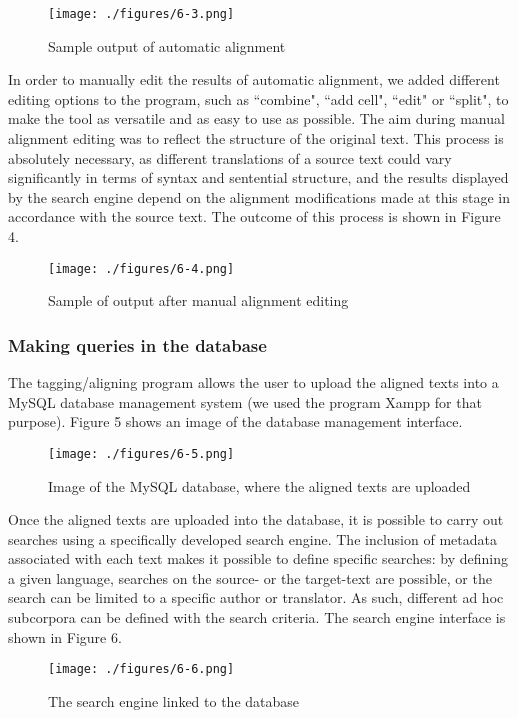 \documentclass[output=paper]{LSP/langsci}
\begin{document}
\begin{figure}[htp] 
\texttt{[image: ./figures/6-3.png]}
\caption{Sample output of automatic alignment}
\end{figure}

In order to manually edit the results of automatic alignment, we added different editing options to the program, such as “combine", “add cell", “edit" or “split", to make the tool as versatile and as easy to use as possible. The aim during manual alignment editing was to reflect the structure of the original text. This process is absolutely necessary, as different translations of a source text could vary significantly in terms of syntax and sentential structure, and the results displayed by the search engine depend on the alignment modifications made at this stage in accordance with the source text. The outcome of this process is shown in Figure 4.

\begin{figure}
\texttt{[image: ./figures/6-4.png]}
\caption{Sample of output after manual alignment editing}
\end{figure}

\subsubsection{Making queries in the database} 
The tagging/aligning program allows the user to upload the aligned texts into a MySQL database management system (we used the program Xampp for that purpose). Figure 5 shows an image of the database management interface.

\begin{figure} 
\texttt{[image: ./figures/6-5.png]}
\caption{Image of the MySQL database, where the aligned texts are uploaded}
\end{figure}

Once the aligned texts are uploaded into the database, it is possible to carry out searches using a specifically developed search engine. The inclusion of metadata associated with each text makes it possible to define specific searches: by defining a given language, searches on the source- or the target-text are possible, or the search can be limited to a specific author or translator. As such, different ad hoc subcorpora can be defined with the search criteria. The search engine interface is shown in Figure 6.


\begin{figure} 
\texttt{[image: ./figures/6-6.png]}
\caption{The search engine linked to the database}
\end{figure}
\end{document}
